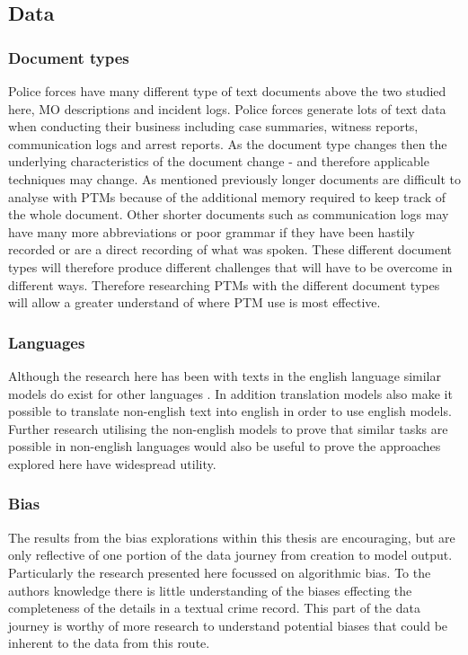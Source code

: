 \subsection{Data}

\subsubsection{Document types} Police forces have many different type of text documents above the two studied here, MO descriptions and incident logs. Police forces generate lots of text data when conducting their business including case summaries, witness reports, communication logs and arrest reports. As the document type changes then the underlying characteristics of the document change - and therefore applicable techniques may change. As mentioned previously longer documents are difficult to analyse with PTMs because of the additional memory required to keep track of the whole document. Other shorter documents such as communication logs may have many more abbreviations or poor grammar if they have been hastily recorded or are a direct recording of what was spoken. These different document types will therefore produce different challenges that will have to be overcome in different ways. Therefore researching PTMs with the different document types will allow a greater understand of where PTM use is most effective.


\subsubsection{Languages}Although the research here has been with texts in the english language similar models do exist for other languages \parencite{scao2022bloom}. In addition translation models also make it possible to translate non-english text into english in order to use english models. Further research utilising the non-english models to prove that similar tasks are possible in non-english languages would also be useful to prove the approaches explored here have widespread utility. 

\subsubsection{Bias} The results from the bias explorations within this thesis are encouraging, but are only reflective of one portion of the data journey from creation to model output. Particularly the research presented here focussed on algorithmic bias. To the authors knowledge there is little understanding of the biases effecting the completeness of the details in a textual crime record. This part of the data journey is worthy of more research to understand potential biases that could be inherent to the data from this route.

